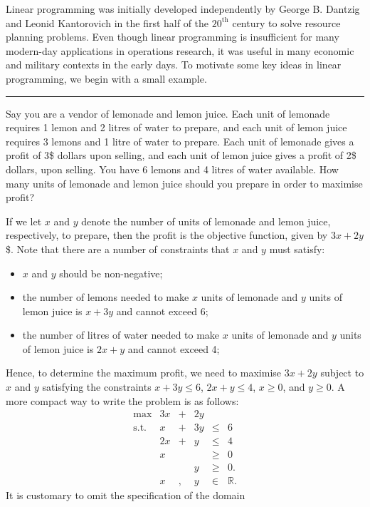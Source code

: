 Linear programming was initially developed independently by George B.
Dantzig and Leonid Kantorovich in the first half of the $20^{\textrm{th}}$ century to
solve resource planning problems. Even though linear programming is
insufficient for many modern-day applications in operations research, it
was useful in many economic and military contexts in the early days. To
motivate some key ideas in linear programming, we begin with a small
example.\begin{center}\rule{0.5\linewidth}{.4pt}\end{center} Say you are a vendor of lemonade and lemon juice. Each unit of lemonade
requires 1 lemon and 2 litres of water to prepare, and each unit of lemon juice
requires 3 lemons and 1 litre of water to prepare. Each unit of lemonade gives a
profit of 3\$ dollars upon selling, and each unit of lemon juice gives a profit of 2\$
dollars, upon selling. You have 6 lemons and 4 litres of water available. How many
units of lemonade and lemon juice should you prepare in order to maximise profit?
\par If we let \(x\) and $y$ denote the number of units of
lemonade and lemon juice, respectively, to prepare, then the profit is the objective function,  given by \(3x + 2y\) \$. Note that there are a number of
constraints that \(x\) and \(y\) must satisfy: 
\begin{itemize}[noitemsep]
\item \(x\) and \(y\) should be non-negative;
\item the number of lemons needed to make \(x\)
units of lemonade and \(y\) units of lemon juice is \(x+3y\) and cannot
exceed 6;
\item the number of litres of water needed to make \(x\) units of
lemonade and \(y\) units of lemon juice is \(2x+y\) and cannot exceed 4;
\end{itemize}
Hence, to determine the maximum profit, we need to maximise \(3x + 2y\)
subject to \(x\) and \(y\) satisfying the constraints \(x + 3y \leq 6\),
\(2x + y \leq 4\), \(x \geq 0\), and \(y \geq 0.\)
\newl A more compact way to write the problem is as follows:
\[\begin{array}{rrcrll}
\max & 3x & + & 2y & \\
\mbox{s.t.}
& x & + & 3y & \leq & 6 \\
& 2x & +&  y & \leq & 4 \\
& x &  & & \geq & 0 \\
& & & y & \geq & 0. \\
& x & , & y & \in & \mathbb{R}.
\end{array}\] It is customary to omit the specification of the domain
